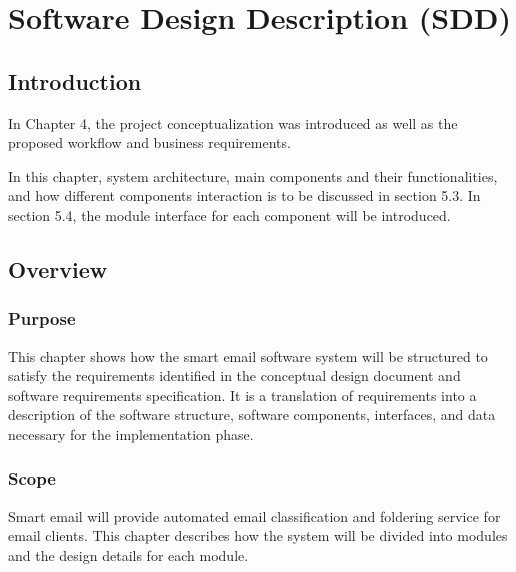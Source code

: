 \newenvironment{my_desc}
{\begin{description}
  \setlength{\itemsep}{0cm}
  \setlength{\parskip}{0cm}}
{\end{description}}

\chapter{Software Design Description (SDD)} %

\label{Chapter5} %


\section{Introduction}
In Chapter 4, the project conceptualization was introduced as well as the 
proposed workflow and business requirements.

In this chapter, system architecture, main components and their functionalities, 
and how different components interaction is to be discussed in section 5.3. 
In section 5.4, the module interface for each component will be introduced.
\section{Overview}

\subsection{Purpose}
This chapter shows how the smart email software system will be 
structured to satisfy the requirements identified in the conceptual 
design document and software requirements specification. It is 
a translation of requirements into a description of the software
structure, software components, interfaces, and data necessary for 
the implementation phase.

\subsection{Scope}
Smart email will provide automated email classification and foldering 
service for email clients. This chapter describes how the system will 
be divided into modules and the design details for each module.


